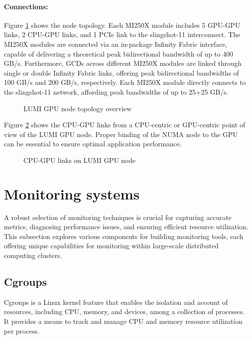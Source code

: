 \paragraph{Connections:}\mbox{}

Figure \ref{fig_lumig_topology} shows the node topology. Each MI250X module includes 5 GPU-GPU links, 2 CPU-GPU links, and 1 PCIe link to the slingshot-11 interconnect. The MI250X modules are connected via an in-package Infinity Fabric interface, capable of delivering a theoretical peak bidirectional bandwidth of up to 400 GB/s. Furthermore, GCDs across different MI250X modules are linked through single or double Infinity Fabric links, offering peak bidirectional bandwidths of 100 GB/s and 200 GB/s, respectively. Each MI250X module directly connects to the slingshot-11 network, affording peak bandwidths of up to 25+25 GB/s. 

\begin{figure}[H]
    \centering
    \caption{LUMI GPU node topology overview \cite{lumi}}
    \label{fig_lumig_topology}
\end{figure}

Figure \ref{fig_lumig_cpu_gpu_links} shows the CPU-GPU links from a CPU-centric or GPU-centric point of view of the LUMI GPU node. Proper binding of the NUMA node to the GPU can be essential to ensure optimal application performance.

\begin{figure}[H]
    \centering
    \caption{CPU-GPU links on LUMI GPU node \cite{lumi}}
    \label{fig_lumig_cpu_gpu_links}
\end{figure}

\section{Monitoring systems}
A robust selection of monitoring techniques is crucial for capturing accurate metrics, diagnosing performance issues, and ensuring efficient resource utilization. This subsection explores various components for building monitoring tools, each offering unique capabilities for monitoring within large-scale distributed computing clusters.

\subsection{Cgroups}
Cgroups \cite{7876184} is a Linux kernel feature that enables the isolation and account of resources, including CPU, memory, and devices, among a collection of processes. It provides a means to track and manage CPU and memory resource utilization per process.

